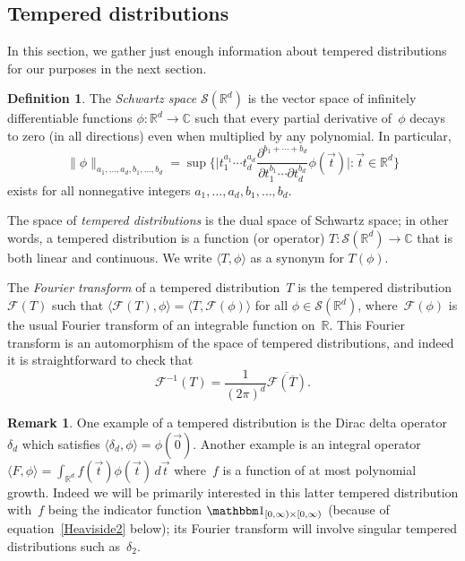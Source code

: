 \documentclass[11pt]{article}
\theoremstyle{plain}
\theoremstyle{definition}
\newtheorem{definition}[thm]{Definition}
\newtheorem{rem}[thm]{Remark}
\numberwithin{equation}{section}
\renewcommand{\bar}{\overline}
\newcommand{\R}{\mathbb R}
\newcommand{\C}{\mathbb C}
\newcommand{\0}{{\vec 0}}
\begin{document}
\subsection{Tempered distributions}

In this section, we gather just enough information about tempered distributions for our purposes in the next section.

\begin{definition}
The {\em Schwartz space} $\mathcal{S}(\R^d)$ is the vector space of infinitely differentiable functions $\phi\colon \R^d\to\C$ such that every partial derivative of~$\phi$ decays to zero (in all directions) even when multiplied by any polynomial. In particular,
\begin{equation} \label{seminorm}
\|\phi\|_{a_1,\dots,a_d,b_1,\dots,b_d} = \sup \biggl\{ \biggl| t_1^{a_1} \cdots t_d^{a_d} \frac{\partial^{b_1+\cdots+b_d}}{\partial t_1^{b_1} \cdots \partial t_d^{b_d}} \phi(\vec t) \biggr| \colon \vec t\in\R^d \biggr\}
\end{equation}
exists for all nonnegative integers $a_1,\dots,a_d,b_1,\dots,b_d$.

The space of {\em tempered distributions} is the dual space of Schwartz space; in other words, a tempered distribution is a function (or operator) $T\colon \mathcal{S}(\R^d) \to \C$ that is both linear and continuous.
We write $\langle T,\phi\rangle$ as a synonym for $T(\phi)$.

The {\em Fourier transform} of a tempered distribution~$T$ is the tempered distribution $\mathcal{F}(T)$ such that $\langle \mathcal{F}(T),\phi \rangle = \langle T,\mathcal{F}(\phi) \rangle$ for all $\phi\in\mathcal{S}(\R^d)$, where~$\mathcal{F}(\phi)$ is the usual Fourier transform of an integrable function on~$\R$. This Fourier transform is an automorphism of the space of tempered distributions, and indeed it is straightforward to check that
\begin{equation} \label{F inverse}
\mathcal{F}^{-1}(T) = \frac1{(2\pi)^d} \overline{\mathcal{F}(\bar T)}.
\end{equation}
\end{definition}

\begin{rem}
One example of a tempered distribution is the Dirac delta operator $\delta_d$ which satisfies $\langle \delta_d,\phi\rangle = \phi(\vec 0)$.
Another example is an integral operator $\langle F,\phi\rangle = \int_{\R^d} f(\vec t)\phi(\vec t) \,d\vec t$ where~$f$ is a function of at most polynomial growth.
Indeed we will be primarily interested in this latter tempered distribution with~$f$ being the indicator function $\mathbbm1_{[0,\infty)\times[0,\infty)}$ (because of equation~\eqref{Heaviside2} below); its Fourier transform will involve singular tempered distributions such as~$\delta_2$.
\end{rem}
\end{document}
